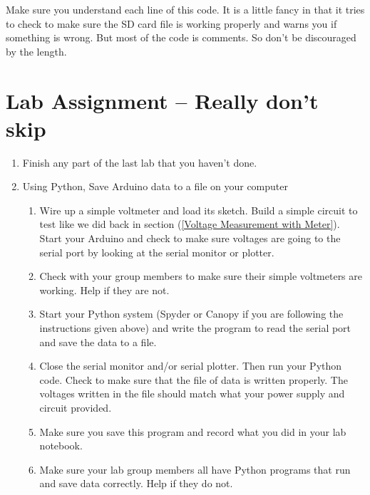 Make sure you understand each line of this code. It is a little fancy in that it tries to check to make sure the SD card file is working properly and warns you if something is wrong. But most of the code is comments. So don't be discouraged by the length.

\section{Lab Assignment -- Really don't skip}

\begin{enumerate}
\item Finish any part of the last lab that you haven't done.

\item Using Python, Save Arduino data to a file on your computer

	\begin{enumerate}
	\item Wire up a simple voltmeter and load its sketch. Build a simple circuit to test like we did back in section (\ref{Voltage Measurement with Meter}). Start your Arduino and check to make sure voltages are going to the serial port by looking at the serial monitor or plotter.
	
	\item Check with your group members to make sure their simple voltmeters are working. Help if they are not.
	
	\item Start your Python system (Spyder or Canopy if you are following the instructions given above) and write the program to read the serial port and save the data to a file.
	
	\item Close the serial monitor and/or serial plotter. Then run your Python code. Check to make sure that the file of data is written properly. The voltages written in the file should match what your power supply and circuit provided.
	
	\item Make sure you save this program and record what you did in your lab notebook.
	
	\item Make sure your lab group members all have Python programs that run and save data correctly. Help if they do not.
	\end{enumerate}

\end{enumerate}
